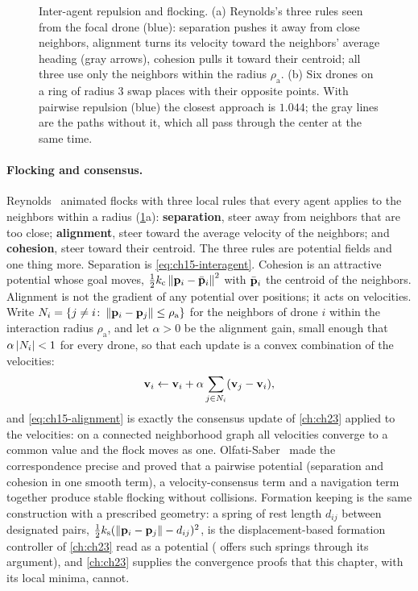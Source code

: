 \begin{figure}[tb]
  \centering
  \caption{Inter-agent repulsion and flocking. (a) Reynolds's three rules
  seen from the focal drone (blue): separation pushes it away from close
  neighbors, alignment turns its velocity toward the neighbors' average
  heading (gray arrows), cohesion pulls it toward their centroid; all three
  use only the neighbors within the radius $\rho_{\mathrm{a}}$. (b) Six
  drones on a ring of radius $3$ swap places with their opposite points.
  With pairwise repulsion (blue) the closest approach is $1.044$; the gray
  lines are the paths without it, which all pass through the center at the
  same time.}
  \label{fig:ch15-swarm}
\end{figure}

\paragraph{Flocking and consensus.}
Reynolds~\cite{reynolds1987flocks} animated flocks with three local rules
that every agent applies to the neighbors within a radius
(\cref{fig:ch15-swarm}a): \textbf{separation},
steer away from neighbors that are too close;
\textbf{alignment}, steer toward the average
velocity of the neighbors; and \textbf{cohesion},
steer toward their centroid. The three rules are potential fields and one
thing more. Separation is \cref{eq:ch15-interagent}. Cohesion is an
attractive potential whose goal moves, $\tfrac12 k_{\mathrm{c}} \left\lVert \mathbf{p}_i
- \bar{\mathbf{p}}_i \right\rVert^2$ with $\bar{\mathbf{p}}_i$ the centroid of the neighbors.
Alignment is not the gradient of any potential over positions; it acts on
velocities. Write $N_i = \left\{ j \ne i \colon \left\lVert \mathbf{p}_i - \mathbf{p}_j \right\rVert \le
\rho_{\mathrm{a}} \right\}$ for the neighbors of drone $i$ within the interaction
radius $\rho_{\mathrm{a}}$, and let $\alpha > 0$ be the alignment gain, small
enough that $\alpha \left\lvert N_i \right\rvert < 1$ for every drone, so that each update is a
convex combination of the velocities:
\begin{equation}
  \mathbf{v}_i \gets \mathbf{v}_i + \alpha \sum_{j \in N_i} (\mathbf{v}_j - \mathbf{v}_i),
  \label{eq:ch15-alignment}
\end{equation}
and \cref{eq:ch15-alignment} is exactly the consensus update of
\cref{ch:ch23} applied to the velocities: on a connected neighborhood graph
all velocities converge to a common value and the flock moves as one.
Olfati-Saber~\cite{olfatisaber2006flocking} made the correspondence precise
and proved that a pairwise potential (separation and cohesion in one smooth
term), a velocity-consensus term and a navigation term together produce
stable flocking without collisions. Formation keeping is the same
construction with a prescribed geometry: a spring of rest length $d_{ij}$
between designated pairs, $\tfrac12 k_{\mathrm{s}} (\left\lVert \mathbf{p}_i - \mathbf{p}_j \right\rVert -
d_{ij})^2$, is the displacement-based formation controller of
\cref{ch:ch23} read as a potential ( offers such
springs through its  argument), and \cref{ch:ch23} supplies
the convergence proofs that this chapter, with its local minima, cannot.

